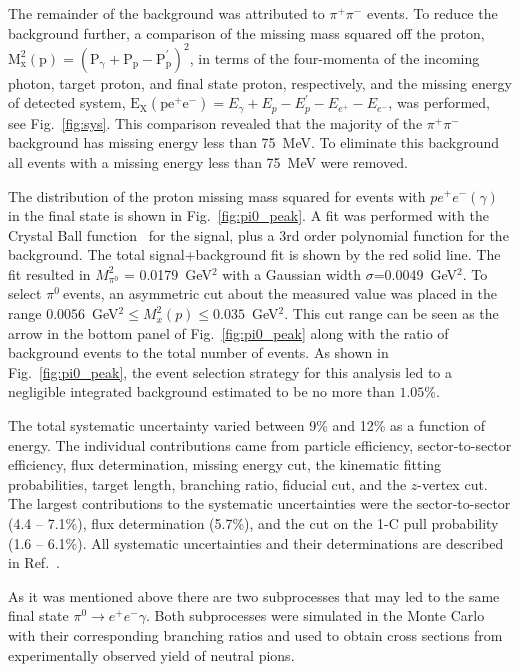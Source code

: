 \documentclass[aps,prc,twocolumn,floatfix,showpacs,preprintnumbers,amsmath,amssymb,superscriptaddress,linenumbers]{revtex4-1}
\def\pizT{$\pi^{0} \ $}
\begin{document}
The remainder of the background was attributed to $\pi^+\pi^-$
events. To reduce the background further, a comparison of the 
missing mass squared off the proton, $\mathrm{M_x^2(p) =(P_\gamma + P_p -P^{'}_p)^2}$, in terms of the four-momenta of the incoming photon, target proton, and final state proton, respectively, and the missing energy of detected system, $\mathrm{E_X(pe^+e^-)}= E_\gamma + E_p  -  E^{'}_p - E_{e^{+}} - E_{e^{-}} $, was performed, see Fig.~\ref{fig:sys}. This 
comparison revealed that the majority of the $\pi^+\pi^-$ background 
has missing energy less than 75~MeV. To eliminate this background 
all events with a missing energy less than 75~MeV were removed.

The distribution of the proton missing mass squared for events with 
$pe^+e^-(\gamma)$ in the final state is shown in Fig.~\ref{fig:pi0_peak}. 
A fit was performed with the Crystal Ball function~\cite{Oreglia:1980cs,
Skwarnicki:1986xj} for the signal, plus a 3rd order polynomial function 
for the background. The total signal+background fit is shown by the red solid 
line. The fit resulted in $M_{\pi^0}^2$ = 0.0179~GeV$^2$ with a Gaussian width
$\sigma$=0.0049~GeV$^2$. To select \pizT events, an asymmetric cut about the measured value was placed 
in the range $0.0056 $~GeV$^2 \le  M_x^2(p) 
\le 0.035$~GeV$^2$. This cut range can be seen as the arrow in the bottom 
panel of Fig.~\ref{fig:pi0_peak} along with the ratio of background 
events to the total number of events. As shown in Fig.~\ref{fig:pi0_peak}, 
the event selection strategy for this analysis led to a 
negligible integrated background estimated to be no more than $1.05\%$.

The total systematic uncertainty varied between 9\% and 12\% as a function of energy. The individual contributions came from particle efficiency, sector-to-sector efficiency, 
flux determination, missing energy cut, the kinematic fitting probabilities, 
target length, branching ratio, fiducial cut, and the $z$-vertex cut.
The largest contributions to the systematic uncertainties 
were the sector-to-sector (4.4 -- 7.1\%), flux determination (5.7\%),
and the cut on the 1-C pull probability (1.6 -- 6.1\%). All systematic 
uncertainties and their determinations are described in Ref.~\cite{Kunkel}.




As it was mentioned above there are two subprocesses that may led to the same final state $\pi^0 \rightarrow e^+e^-\gamma$. Both subprocesses
were simulated in the Monte Carlo with their corresponding branching ratios and used to obtain cross sections from experimentally observed yield of neutral pions.
\end{document}
